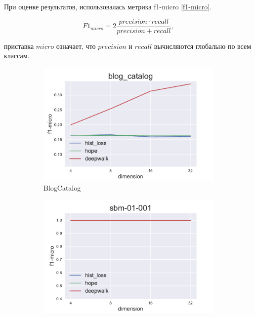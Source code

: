 \documentclass[12pt,a4paper]{extarticle}
\begin{document}
    При оценке результатов, использовалась метрика f1-micro \eqref{f1-micro}.
    
    \begin{equation} \label{f1-micro}
        F1_{micro} = 2 \frac{precision \cdot recall}{precision + recall},
    \end{equation}
    
    приставка $micro$ означает, что $precision$ и $recall$ вычисляются глобально по всем классам.
    
    \begin{figure}
    \begin{subfigure}{.5\linewidth}
    \centering
    \includegraphics[width=\linewidth]{src/images/Node_classification_blog_catalog.pdf}
    \caption{BlogCatalog}
    \label{fig:clas_blog}
    \end{subfigure}
    \begin{subfigure}{.5\linewidth}
    \centering
    \includegraphics[width=\linewidth]{src/images/Node_classification_sbm-01-001.pdf}

\end{subfigure}
\end{figure}
\end{document}

